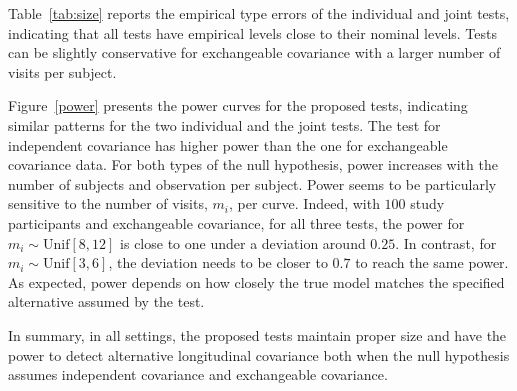 \documentclass[submit]{smj}
\begin{document}
Table~\ref{tab:size} reports the empirical type \uppercase\expandafter{} errors
of the individual and joint tests, indicating that all tests have empirical levels  close to their nominal levels. Tests can be slightly conservative for exchangeable covariance with a larger number of visits per subject.

Figure~\ref{power} presents the power curves for the proposed tests, indicating similar patterns for the two individual and the joint tests. The test for independent covariance has higher power than the one for exchangeable covariance data. For both types of the null hypothesis, power increases with the number of subjects and  observation per subject. Power seems to be particularly sensitive to the number of visits,  $m_i$, per curve. Indeed, with $100$ study participants and exchangeable covariance, for all three tests, the power for $m_i \sim \text{Unif}[8,12]$ is close to one under a deviation around $0.25$. In contrast, for $m_i \sim \text{Unif}[3,6]$, the deviation needs to be closer to $0.7$ to reach the same power. As expected, power depends on how closely the true model matches the specified alternative assumed by the test.   

In summary, in all settings, the proposed tests maintain proper size and have the power to detect alternative longitudinal covariance both when the null hypothesis assumes independent covariance and exchangeable covariance.
\end{document}
